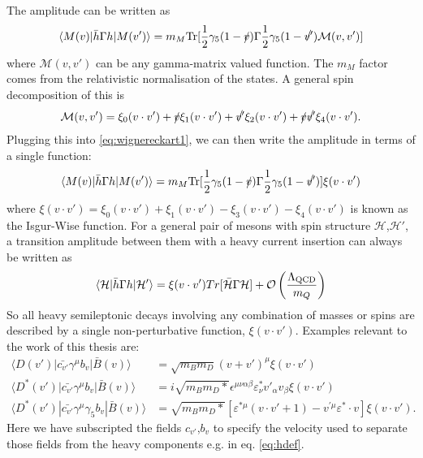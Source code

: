 The amplitude can be written as
\begin{align}
	\langle M(v) | \bar{h} \Gamma h | M(v') \rangle = m_M \text{Tr}[ {1\over 2} \gamma_5 (1 - \slashed{v}) \Gamma {1\over 2} \gamma_5 (1 - \slashed{v'}) \mathcal{M}(v,v')]
	\label{eq:wignereckart1}
\end{align} 
where $\mathcal{M}(v,v')$ can be any gamma-matrix valued function. The $m_M$ factor comes from the relativistic normalisation of the states. A general spin decomposition of this is
\begin{align}
	\mathcal{M}(v,v') = \xi_0(v\cdot v') + \slashed{v} \xi_1(v\cdot v') + \slashed{v'} \xi_2(v\cdot v') + \slashed{v}\slashed{v'} \xi_4(v\cdot v').
\end{align}
Plugging this into \eqref{eq:wignereckart1}, we can then write the amplitude in terms of a single function:
\begin{align}
\langle M(v) | \bar{h} \Gamma h | M(v') \rangle = m_M \text{Tr}[ {1\over 2} \gamma_5 (1 - \slashed{v}) \Gamma {1\over 2} \gamma_5 (1 - \slashed{v'}) ] \xi(v\cdot v')
\end{align}
where $\xi(v\cdot v') = \xi_0(v\cdot v') + \xi_1(v\cdot v') - \xi_3(v\cdot v') - \xi_4(v\cdot v')$ is known as the Isgur-Wise function. For a general pair of mesons with spin structure $\mathcal{H}$,$\mathcal{H}'$, a transition amplitude between them with a heavy current insertion can always be written as
\begin{align}
	\langle \mathcal{H} | \bar{h} \Gamma h | \mathcal{H}' \rangle = \xi(v\cdot v') Tr[ \bar{\mathcal{H}} \Gamma \mathcal{H} ] + \mathcal{O}\left( \Lambda_{\text{QCD}}\over m_Q \right)
\end{align}
So all heavy semileptonic decays involving any combination of masses or spins are described by a single non-perturbative function, $\xi(v\cdot v')$. Examples relevant to the work of this thesis are:
\begin{align}
	\langle D(v') | \bar{c_{v'}} \gamma^{\mu} b_v | \bar{B}(v) \rangle &= \sqrt{m_B m_D} ( v + v')^{\mu} \xi(v\cdot v') \\
	\langle D^*(v') | \bar{c_{v'}} \gamma^{\mu} b_v | \bar{B}(v) \rangle &= i \sqrt{m_B m_D*} \epsilon^{\mu\nu\alpha\beta} \varepsilon_{\nu}^* v'_{\alpha} v_{\beta} \xi(v\cdot v')  \\
	\langle D^*(v') | \bar{c_{v'}} \gamma^{\mu}\gamma_5 b_v | \bar{B}(v) \rangle &= \sqrt{m_B m_D*} [ \varepsilon^{*\mu}(v\cdot v' + 1) - v^{'\mu} \varepsilon^*\cdot v] \xi(v\cdot v').
\end{align}
Here we have subscripted the fields $c_{v'}$,$b_v$ to specify the velocity used to separate those fields from the heavy components e.g. in eq. \eqref{eq:hdef}. 

